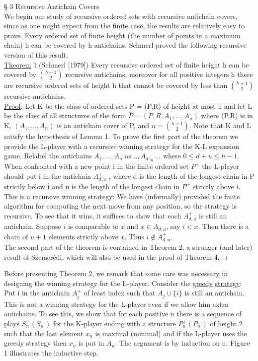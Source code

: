 \documentclass[twoside]{article}
\begin{document}
\noindent\S \hspace{1pt} 3 Recursive Antichain Covers\\
\newline
\indent We begin our study of recursive ordered sets with recursive antichain covers, since as one might expect from the finite case,  the results are relatively easy to prove.   
Every ordered set of finite height (the number of points in a maximum chain) h   can be covered by   h   antichains. 
Schmerl proved the following recursive version of this result.\\
\newline
\underline{Theorem} 1.(Schmerl [1979])   Every recursive ordered set of finite height h can be covered by $\binom{h+1}{2}$  recursive antichains; moreover for all positive integers   h there are recursive ordered sets of height   h   that cannot be covered by less than $\binom{h+1}{2}$ recursive antichains.\\
\newline
\underline{Proof}. Let K be the class of ordered sets P = (P,R) of height at most h and let L be the class of all structures of the form $\bar{P} = (P,R,A_1,...,A_n)$ where (P,R) is in K, $(A_1,...,A_n)$ is an antichain cover of P, and $n = \binom{h+1}{2}$. Note that K and L satisfy the hypothesis of Lemma 1. 
To prove the first part of the theorem we provide the L-player with a recursive winning strategy for the K-L expansion game. Relabel the antichains $A_1,...,A_n$ as $..,A_d,_u...$ where $0 \leq d+u \leq h-1$.   
When confronted with a new point i in the
finite ordered set $P^+$ the L-player should put i in the antichain $A_{d,u}^+$   , where d  is the length of the longest chain in P   strictly below i and u is the
length of the longest chain in $P^+$ strictly above i.   This is a recursive
winning strategy: We have (informally) provided the finite algorithm for
computing the next move from any position, so the strategy is recursive. To
see that it wins, it suffices to show that each $A_{d,u}^+$  is still an antichain.
Suppose $i$ is comparable to $x$ and $x \in A_{d,u}$, say $i < x$. Then there is a chain of $u + 1$ elements strictly above $x$. Thus $i \not \in A_{d,u}^+$.\\
\indent The second part of the theorem is contained in Theorem 2, a stronger (and later) result of Szemer\'{e}di, which will also be used in the proof of Theorem 4.$\Box$

\newpage
%
%


Before presenting Theorem 2, we remark that some care was necessary in designing the winning strategy for the   L-player.   Consider the \underline{greedy} \underline{strategy}:    Put    i    in the antichain  $A_j^+$   of least index such that   $A_j \cup  \{i\}$ is    still an antichain.    
This is not a winning strategy for the   L-player even if we allow him extra antichains.    
To see this, we show that for each positive n    there is a sequence of plays $S_n^+  (S_n^-)$   for the   K-player ending with a
structure $P_n^+  (P_n^-)$   of height   2   such that the last element $x_n$    is maximal
(minimal) and if the   L-player uses the greedy strategy then $x_n$   is put in $A_n$.   The argument is by induction on   n.    Figure 1 illustrates the inductive step.
\end{document}
